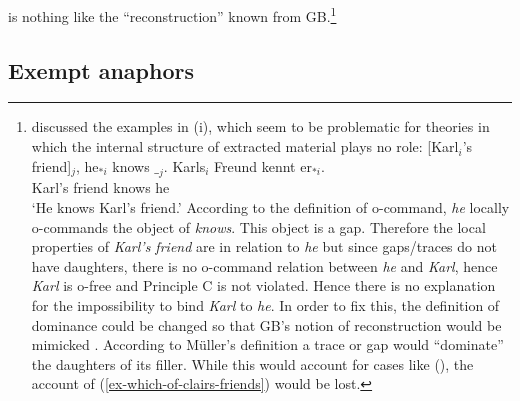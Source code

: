 \documentclass[output=paper
 	        ,biblatex
                ,babelshorthands
                ,newtxmath
                ,draftmode
                ,colorlinks, citecolor=brown
]{langscibook}
\begin{document}
is nothing like the ``reconstruction'' known from GB.\footnote{
\citet[Section~20.2]{Mueller99a} discussed the examples in (i), which seem to be problematic for
theories in which the internal structure of extracted material plays no role:
\eal
\ex {}[Karl$_i$'s friend]$_j$, he$_{*i}$ knows $\__j$.
\ex 
\gll Karls$_i$ Freund kennt er$_{*i}$.\\
     Karl's    friend knows he\\
\glt `He knows Karl's friend.'
\zl
{}
According to the definition of o-command, \emph{he} locally o-commands the object of
\emph{knows}. This object is a gap. Therefore the local properties of \emph{Karl's
  friend} are in relation to \emph{he} but since gaps/traces do not have daughters, there is no o-command
relation between \emph{he} and \emph{Karl}, hence \emph{Karl} is o-free and Principle C is not
violated. Hence there is no explanation for the impossibility to bind \emph{Karl} to \emph{he}. In
order to fix this, the definition of dominance could be changed so that GB's notion of
reconstruction would be mimicked \citep[--410]{Mueller99a}. According to Müller's definition a trace or gap
would ``dominate'' the daughters of its filler. While this would account for cases like (),
the account of (\ref{ex-which-of-clairs-friends}) would be lost.
}

\subsection{Exempt anaphors}
\label{sec-excempt-anaphors}\label{binding:sec-excempt-anaphors}
\end{document}
